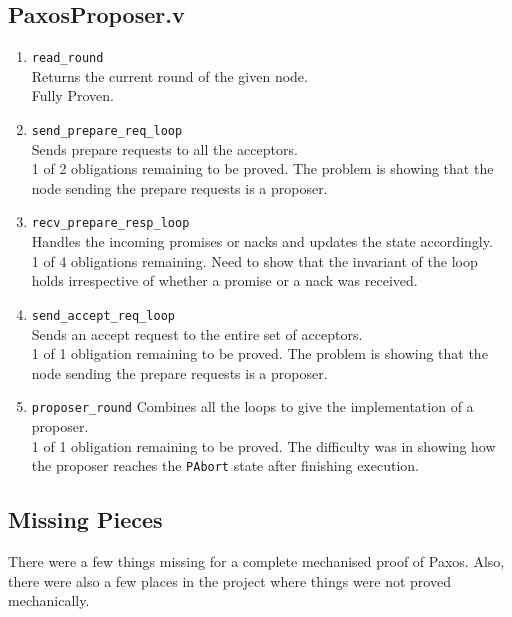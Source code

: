 \subsection{PaxosProposer.v}
\begin{enumerate}
  \item \texttt{read\_round} \\
    Returns the current round of the given node. \\
    Fully Proven.
  \item \texttt{send\_prepare\_req\_loop} \\
    Sends prepare requests to all the acceptors. \\
    1 of 2 obligations remaining to be proved. The problem is showing that
    the node sending the prepare requests is a proposer.
  \item \texttt{recv\_prepare\_resp\_loop} \\
    Handles the incoming promises or nacks and updates the state accordingly. \\
    1 of 4 obligations remaining. Need to show that the invariant of the loop holds
    irrespective of whether a promise or a nack was received.
  \item \texttt{send\_accept\_req\_loop} \\
    Sends an accept request to the entire set of acceptors. \\
    1 of 1 obligation remaining to be proved. The problem is showing that
    the node sending the prepare requests is a proposer.
  \item \texttt{proposer\_round}
  Combines all the loops to give the implementation of a proposer. \\
  1 of 1 obligation remaining to be proved. The difficulty was in showing how
  the proposer reaches the \texttt{PAbort} state after finishing execution.
\end{enumerate}

\subsection{Missing Pieces}
There were a few things missing for a complete mechanised proof of Paxos.
Also, there were also a few places in the project where things
were not proved mechanically.

